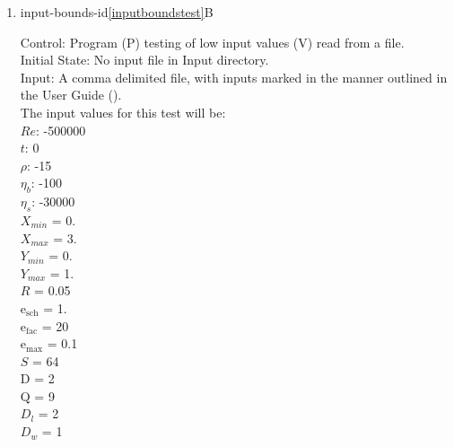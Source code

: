 \documentclass[12pt, titlepage]{article}
\newcommand{\famname}{Lattice Boltzmann Solver}
\begin{document}
\begin{enumerate}
Test Case Derivation: 
I (individual inputs) are an element of V. P(V) is incorrect if P:V and at least
one I is out of bounds as per Table \ref{table:inputdatabounds}: Input Data
Bounds. This test satisfies R3.\\
					
How test will be performed: 

\begin{enumerate}
\item Outside of the system, the input values will be written to a comma
  delimited text file titled input.txt, as outlined in the User Guide
  (\citet{LBM_UserGuide_PM}).
\item The file will be placed into the Input directory, under the home directory
  of the project.
\item {\famname} will be run.
\item If the test is successful, the system will output a descriptive error message, as seen above, to the screen.\\

\end{enumerate}

\item{input-bounds-id\ref{inputboundstest}B\\}

Control: Program (P) testing of low input values (V) read from a file.\\

Initial State: No input file in Input directory.\\

Input: A comma delimited file, with inputs marked in the manner outlined in the
User Guide (\citet{LBM_UserGuide_PM}).\\The input values for this test will
be:\\$Re$: -500000\\
$t$: 0\\
$\rho$: -15\\
$\eta_b$: -100\\
$\eta_s$: -30000\\
$X_{min}$ = 0.\\
$X_{max}$ = 3.\\
$Y_{min}$ = 0.\\
$Y_{max}$ = 1.\\
$R$ = 0.05\\
$\mathrm{e_{sch}}$ = 1.\\
$\mathrm{e_{fac}}$ = 20\\
$\mathrm{e_{max}}$ = 0.1\\
$S$ = 64\\
$\mathrm{D}$ = 2\\
$\mathrm{Q}$ = 9\\
$D_{l}$ = 2\\
$D_{w}$ = 1\\


\end{enumerate}
\end{document}
